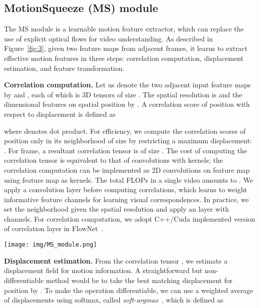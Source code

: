 \documentclass[runningheads]{llncs}
\begin{document}
\subsection{MotionSqueeze (MS) module}
The MS module is a learnable motion feature extractor, which can replace the use of explicit optical flows for video understanding.
As described in Figure~\ref{fig:3}, given two feature maps from adjacent frames, it learns to extract effective motion features in three steps: correlation computation, displacement estimation, and feature transformation. 

\smallbreak
\noindent
\textbf{Correlation computation.} 
Let us denote the two adjacent input feature maps by  and , each of which is 3D tensors of size . The spatial resolution is  and the  dimensional features on spatial position  by .
A correlation score of position  with respect to displacement  is defined as 

where  denotes dot product.
For efficiency, we compute the correlation scores of position  only in its neighborhood of size  by restricting a maximum displacement:  .
For  frame, a resultant correlation tensor  is of size . 
The cost of computing the correlation tensor is equivalent to that of   convolutions with  kernels; the correlation computation can be implemented as 2D convolutions on  feature map using  feature map as  kernels.
The total FLOPs in a single video amounts to .
We apply a convolution layer before computing correlations, which learns to weight informative feature channels for learning visual correspondences.
In practice, we set the neighborhood  given the spatial resolution  and apply an  layer with  channels. For correlation computation, we adopt C++/Cuda implemented version of correlation layer in FlowNet~\cite{dosovitskiy2015flownet}.


\begin{figure*}[t]
    \centering
    \texttt{[image: img/MS\_module.png]}
\caption{
Overall process of MotionSqueeze (MS) module. The MS module estimates motion across two frame-wise feature maps () of adjacent frames. A correlation tensor  is obtained by computing correlations, and then a displacement tensor  is estimated using the tensor. Through the transformation process of convolution layers, the final motion feature  is obtained.
See text for details.
} \label{fig:3}
\end{figure*}

\smallbreak
\noindent
\textbf{Displacement estimation.} 
From the correlation tensor , we estimate a displacement field for motion information.
A straightforward but non-differentiable method would be to take the best matching displacement for position  by . 
To make the operation differentiable, we can use a weighted average of displacements using softmax, called {\em soft-argmax}~\cite{honari2018improving,lee2019sfnet}, which is defined as 
\end{document}
